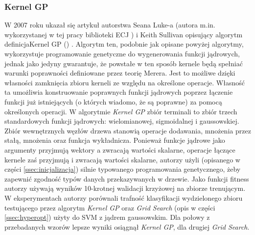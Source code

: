\subsubsection{Kernel GP}
W 2007 roku ukazał się artykuł autorstwa Seana Luke-a (autora m.in. wykorzystanej w tej pracy biblioteki ECJ \cite{sean_ecj_2010}) i Keith Sullivan opisujący algorytm definicja{Kernel GP }() \cite{sullivan_evolving_2007}. Algorytm ten, podobnie jak opisane powyżej algorytmy, wykorzystuje programowanie genetyczne do wygenerowania funkcji jądrowych, jednak jako jedyny gwarantuje, że powstałe w ten sposób kernele będą spełniać warunki poprawności definiowane przez teorię Merera. Jest to możliwe dzięki własności zamknięcia zbioru kerneli ze względu na określone operacje. Własność ta umożliwia konstruowanie poprawnych funkcji jądrowych poprzez łączenie funkcji już istniejących (o których wiadomo, że są poprawne) za pomocą określonych operacji. W algorytmie \emph{Kernel GP} zbiór terminali to zbiór trzech standardowych funkcji jądrowych: wielomianowej, sigmoidalnej i gaussowskiej. Zbiór wewnętrznych węzłów drzewa stanowią operacje dodawania, mnożenia przez stałą, mnożenia oraz funkcja wykładnicza. Ponieważ funkcje jądrowe jako argumenty przyjmują wektory a zwracają wartości skalarne, operacje łączące kernele zaś przyjmują i zwracają wartości skalarne, autorzy użyli (opisanego w części \ref{ssec:inicjalizacja}) silnie typowanego programowania genetycznego, żeby zapewnić zgodność typów danych przekazywanych w drzewie.
Jako funkcji fitness autorzy używają wyników 10-krotnej walidacji krzyżowej na zbiorze trenującym.
W eksperymentach autorzy porównali trafność klasyfikacji wydzielonego zbioru testującego przez algorytm \emph{Kernel GP} oraz \emph{Grid Search} (opis w części \ref{ssec:hyperopt}) użyty do SVM z jądrem gaussowskim. Dla połowy z przebadanych wzorów lepsze wyniki osiągnął \emph{Kernel GP}, dla drugiej \emph{Grid Search}.


\clearpage